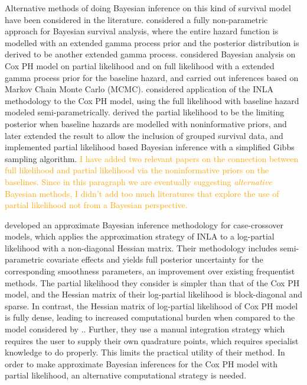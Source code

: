 \documentclass[ba]{imsart}
\newcommand{\ziang}[1]{\textcolor{orange}{{ }#1}}
\begin{document}
Alternative methods of doing Bayesian inference on this kind of survival model have been considered in the literature. \cite{BayesianNonpara} considered a fully non-parametric approach for Bayesian survival analysis, where the entire hazard function is modelled with an extended gamma process prior and the posterior distribution is derived to be another extended gamma process. \cite{BayesianPartialMCMC} considered Bayesian analysis on Cox PH model on partial likelihood and on full likelihood with a extended gamma process prior for the baseline hazard, and carried out inferences based on Markov Chain Monte Carlo (MCMC). \cite{inlacoxph} considered application of the INLA methodology to the Cox PH model, using the full likelihood with baseline hazard modeled semi-parametrically. \cite{PartialandFull1} derived the partial likelihood to be the limiting posterior when baseline hazards are modelled with noninformative priors, and \cite{PartialandFull2} later extended the result to allow the inclusion of grouped survival data, and implemented partial likelihood based Bayesian inference with a simplified Gibbs sampling algorithm. 
\ziang{I have added two relevant papers on the connection between full likelihood and partial likelihood via the noninformative priors on the baselines. Since in this paragraph we are eventually suggesting \textit{alternative} Bayesian methods, I didn't add too much literatures that explore the use of partial likelihood not from a Bayesian perspective. }

\cite{casecross} developed an approximate Bayesian inference methodology for case-crossover models, which applies the approximation strategy of INLA to a log-partial likelihood with a non-diagonal Hessian matrix. Their methodology includes semi-parametric covariate effects and yields full posterior uncertainty for the corresponding smoothness parameters, an improvement over existing frequentist methods. The partial likelihood they consider is simpler than that of the Cox PH model, and the Hessian matrix of their log-partial likelihood is block-diagonal and sparse. In contrast, the Hessian matrix of log-partial likelihood of Cox PH model is fully dense, leading to increased computational burden when compared to the model considered by \cite{casecross}.. Further, they use a manual integration strategy which requires the user to supply their own quadrature points, which requires specialist knowledge to do properly. This limits the practical utility of their method. In order to make approximate Bayesian inferences for the Cox PH model with partial likelihood, an alternative computational strategy is needed.
\end{document}
